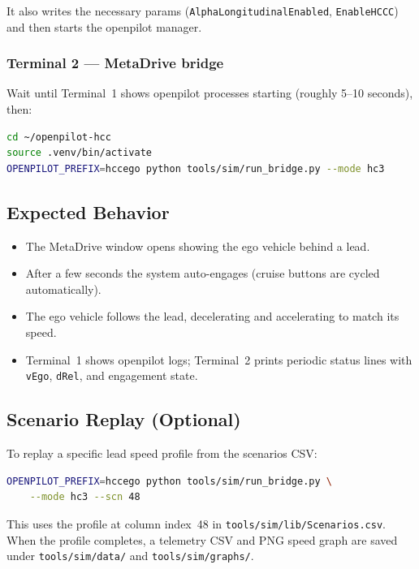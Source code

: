 \documentclass[11pt, letterpaper]{article}
\begin{document}
It also writes the necessary params (\texttt{AlphaLongitudinalEnabled},
\texttt{EnableHCCC}) and then starts the openpilot manager.

\subsubsection{Terminal 2 --- MetaDrive bridge}

Wait until Terminal~1 shows openpilot processes starting (roughly 5--10
seconds), then:

\begin{lstlisting}[language=bash]
cd ~/openpilot-hcc
source .venv/bin/activate
OPENPILOT_PREFIX=hccego python tools/sim/run_bridge.py --mode hc3
\end{lstlisting}

\subsection{Expected Behavior}

\begin{itemize}
  \item The MetaDrive window opens showing the ego vehicle behind a lead.
  \item After a few seconds the system auto-engages (cruise buttons are
        cycled automatically).
  \item The ego vehicle follows the lead, decelerating and accelerating
        to match its speed.
  \item Terminal~1 shows openpilot logs; Terminal~2 prints periodic
        status lines with \texttt{vEgo}, \texttt{dRel}, and engagement
        state.
\end{itemize}

\subsection{Scenario Replay (Optional)}

To replay a specific lead speed profile from the scenarios CSV:

\begin{lstlisting}[language=bash]
OPENPILOT_PREFIX=hccego python tools/sim/run_bridge.py \
    --mode hc3 --scn 48
\end{lstlisting}

This uses the profile at column index~48 in
\texttt{tools/sim/lib/Scenarios.csv}.  When the profile completes, a
telemetry CSV and PNG speed graph are saved under
\texttt{tools/sim/data/} and \texttt{tools/sim/graphs/}.
\end{document}
